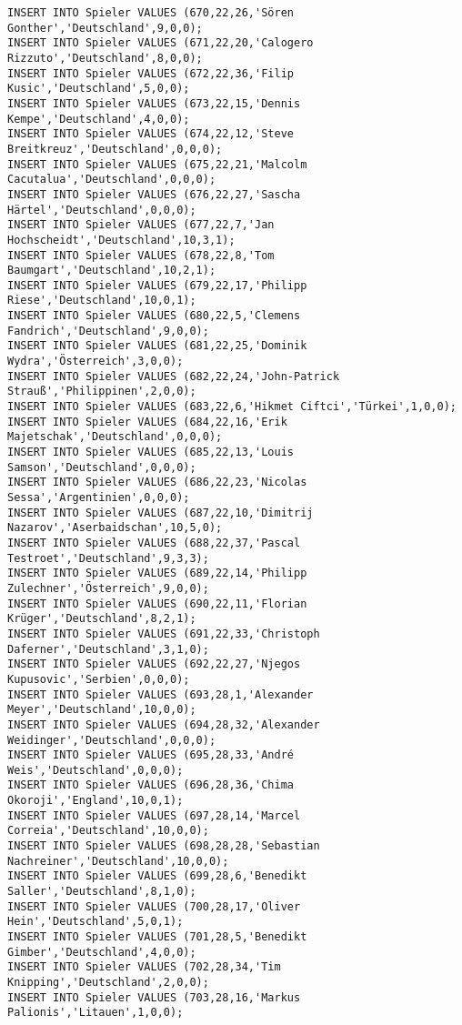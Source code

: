 \documentclass{bschlangaul-aufgabe}
\begin{document}
\begin{verbatim}
INSERT INTO Spieler VALUES (670,22,26,'Sören Gonther','Deutschland',9,0,0);
INSERT INTO Spieler VALUES (671,22,20,'Calogero Rizzuto','Deutschland',8,0,0);
INSERT INTO Spieler VALUES (672,22,36,'Filip Kusic','Deutschland',5,0,0);
INSERT INTO Spieler VALUES (673,22,15,'Dennis Kempe','Deutschland',4,0,0);
INSERT INTO Spieler VALUES (674,22,12,'Steve Breitkreuz','Deutschland',0,0,0);
INSERT INTO Spieler VALUES (675,22,21,'Malcolm Cacutalua','Deutschland',0,0,0);
INSERT INTO Spieler VALUES (676,22,27,'Sascha Härtel','Deutschland',0,0,0);
INSERT INTO Spieler VALUES (677,22,7,'Jan Hochscheidt','Deutschland',10,3,1);
INSERT INTO Spieler VALUES (678,22,8,'Tom Baumgart','Deutschland',10,2,1);
INSERT INTO Spieler VALUES (679,22,17,'Philipp Riese','Deutschland',10,0,1);
INSERT INTO Spieler VALUES (680,22,5,'Clemens Fandrich','Deutschland',9,0,0);
INSERT INTO Spieler VALUES (681,22,25,'Dominik Wydra','Österreich',3,0,0);
INSERT INTO Spieler VALUES (682,22,24,'John-Patrick Strauß','Philippinen',2,0,0);
INSERT INTO Spieler VALUES (683,22,6,'Hikmet Ciftci','Türkei',1,0,0);
INSERT INTO Spieler VALUES (684,22,16,'Erik Majetschak','Deutschland',0,0,0);
INSERT INTO Spieler VALUES (685,22,13,'Louis Samson','Deutschland',0,0,0);
INSERT INTO Spieler VALUES (686,22,23,'Nicolas Sessa','Argentinien',0,0,0);
INSERT INTO Spieler VALUES (687,22,10,'Dimitrij Nazarov','Aserbaidschan',10,5,0);
INSERT INTO Spieler VALUES (688,22,37,'Pascal Testroet','Deutschland',9,3,3);
INSERT INTO Spieler VALUES (689,22,14,'Philipp Zulechner','Österreich',9,0,0);
INSERT INTO Spieler VALUES (690,22,11,'Florian Krüger','Deutschland',8,2,1);
INSERT INTO Spieler VALUES (691,22,33,'Christoph Daferner','Deutschland',3,1,0);
INSERT INTO Spieler VALUES (692,22,27,'Njegos Kupusovic','Serbien',0,0,0);
INSERT INTO Spieler VALUES (693,28,1,'Alexander Meyer','Deutschland',10,0,0);
INSERT INTO Spieler VALUES (694,28,32,'Alexander Weidinger','Deutschland',0,0,0);
INSERT INTO Spieler VALUES (695,28,33,'André Weis','Deutschland',0,0,0);
INSERT INTO Spieler VALUES (696,28,36,'Chima Okoroji','England',10,0,1);
INSERT INTO Spieler VALUES (697,28,14,'Marcel Correia','Deutschland',10,0,0);
INSERT INTO Spieler VALUES (698,28,28,'Sebastian Nachreiner','Deutschland',10,0,0);
INSERT INTO Spieler VALUES (699,28,6,'Benedikt Saller','Deutschland',8,1,0);
INSERT INTO Spieler VALUES (700,28,17,'Oliver Hein','Deutschland',5,0,1);
INSERT INTO Spieler VALUES (701,28,5,'Benedikt Gimber','Deutschland',4,0,0);
INSERT INTO Spieler VALUES (702,28,34,'Tim Knipping','Deutschland',2,0,0);
INSERT INTO Spieler VALUES (703,28,16,'Markus Palionis','Litauen',1,0,0);

\end{verbatim}
\end{document}
